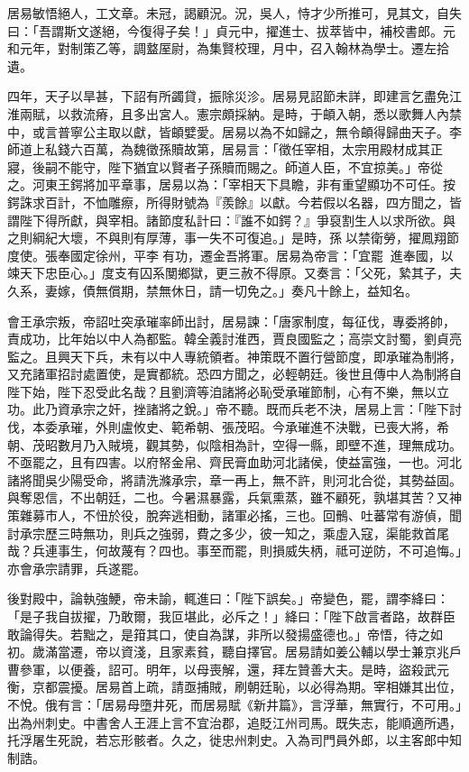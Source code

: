 \begin{pinyinscope}
 居易敏悟絕人，工文章。未冠，謁顧況。況，吳人，恃才少所推可，見其文，自失曰：「吾謂斯文遂絕，今復得子矣！」貞元中，擢進士、拔萃皆中，補校書郎。元和元年，對制策乙等，調盩厔尉，為集賢校理，月中，召入翰林為學士。遷左拾遺。



 四年，天子以旱甚，下詔有所蠲貸，振除災沴。居易見詔節未詳，即建言乞盡免江淮兩賦，以救流瘠，且多出宮人。憲宗頗採納。是時，于頔入朝，悉以歌舞人內禁中，或言普寧公主取以獻，皆頔嬖愛。居易以為不如歸之，無令頔得歸曲天子。李師道上私錢六百萬，為魏徵孫贖故第，居易言：「徵任宰相，太宗用殿材成其正寢，後嗣不能守，陛下猶宜以賢者子孫贖而賜之。師道人臣，不宜掠美。」帝從之。河東王鍔將加平章事，居易以為：「宰相天下具瞻，非有重望顯功不可任。按鍔誅求百計，不恤雕瘵，所得財號為『羨餘』以獻。今若假以名器，四方聞之，皆謂陛下得所獻，與宰相。諸節度私計曰：『誰不如鍔？』爭裒割生人以求所欲。與之則綱紀大壞，不與則有厚薄，事一失不可復追。」是時，孫以禁衛勞，擢鳳翔節度使。張奉國定徐州，平李有功，遷金吾將軍。居易為帝言：「宜罷，進奉國，以竦天下忠臣心。」度支有囚系閺鄉獄，更三赦不得原。又奏言：「父死，縶其子，夫久系，妻嫁，債無償期，禁無休日，請一切免之。」奏凡十餘上，益知名。



 會王承宗叛，帝詔吐突承璀率師出討，居易諫：「唐家制度，每征伐，專委將帥，責成功，比年始以中人為都監。韓全義討淮西，賈良國監之；高崇文討蜀，劉貞亮監之。且興天下兵，未有以中人專統領者。神策既不置行營節度，即承璀為制將，又充諸軍招討處置使，是實都統。恐四方聞之，必輕朝廷。後世且傳中人為制將自陛下始，陛下忍受此名哉？且劉濟等洎諸將必恥受承璀節制，心有不樂，無以立功。此乃資承宗之奸，挫諸將之銳。」帝不聽。既而兵老不決，居易上言：「陛下討伐，本委承璀，外則盧攸史、範希朝、張茂昭。今承璀進不決戰，已喪大將，希朝、茂昭數月乃入賊境，觀其勢，似陰相為計，空得一縣，即壁不進，理無成功。不亟罷之，且有四害。以府帑金帛、齊民膏血助河北諸侯，使益富強，一也。河北諸將聞吳少陽受命，將請洗滌承宗，章一再上，無不許，則河北合從，其勢益固。與奪恩信，不出朝廷，二也。今暑濕暴露，兵氣熏蒸，雖不顧死，孰堪其苦？又神策雜募市人，不忸於役，脫奔逃相動，諸軍必搖，三也。回鶻、吐蕃常有游偵，聞討承宗歷三時無功，則兵之強弱，費之多少，彼一知之，乘虛入寇，渠能救首尾哉？兵連事生，何故蔑有？四也。事至而罷，則損威失柄，祗可逆防，不可追悔。」亦會承宗請罪，兵遂罷。



 後對殿中，論執強鯁，帝未諭，輒進曰：「陛下誤矣。」帝變色，罷，謂李絳曰：「是子我自拔擢，乃敢爾，我叵堪此，必斥之！」絳曰：「陛下啟言者路，故群臣敢論得失。若黜之，是箝其口，使自為謀，非所以發揚盛德也。」帝悟，待之如初。歲滿當遷，帝以資淺，且家素貧，聽自擇官。居易請如姜公輔以學士兼京兆戶曹參軍，以便養，詔可。明年，以母喪解，還，拜左贊善大夫。是時，盜殺武元衡，京都震擾。居易首上疏，請亟捕賊，刷朝廷恥，以必得為期。宰相嫌其出位，不悅。俄有言：「居易母墮井死，而居易賦《新井篇》，言浮華，無實行，不可用。」出為州刺史。中書舍人王涯上言不宜治郡，追貶江州司馬。既失志，能順適所遇，托浮屠生死說，若忘形骸者。久之，徙忠州刺史。入為司門員外郎，以主客郎中知制誥。




\end{pinyinscope}

